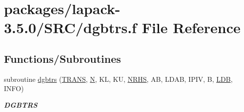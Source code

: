 \hypertarget{dgbtrs_8f}{}\section{packages/lapack-\/3.5.0/\+S\+R\+C/dgbtrs.f File Reference}
\label{dgbtrs_8f}
\subsection*{Functions/\+Subroutines}
\begin{DoxyCompactItemize}
\item 
subroutine \hyperlink{group__doubleGBcomputational_ga37ca5bf29c33e026922c06b3bf188513}{dgbtrs} (\hyperlink{superlu__enum__consts_8h_a0c4e17b2d5cea33f9991ccc6a6678d62a1f61e3015bfe0f0c2c3fda4c5a0cdf58}{T\+R\+A\+N\+S}, \hyperlink{polmisc_8c_a0240ac851181b84ac374872dc5434ee4}{N}, K\+L, K\+U, \hyperlink{example__user_8c_aa0138da002ce2a90360df2f521eb3198}{N\+R\+H\+S}, A\+B, L\+D\+A\+B, I\+P\+I\+V, B, \hyperlink{example__user_8c_a50e90a7104df172b5a89a06c47fcca04}{L\+D\+B}, I\+N\+F\+O)
\begin{DoxyCompactList}\small\item\em {\bfseries D\+G\+B\+T\+R\+S} \end{DoxyCompactList}\end{DoxyCompactItemize}
